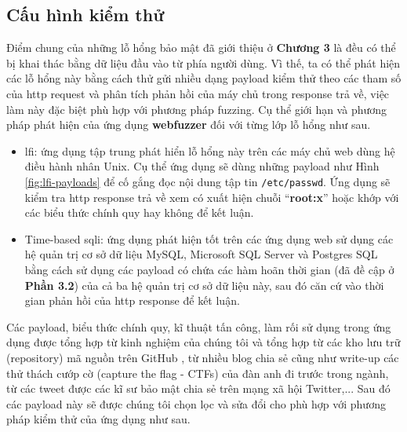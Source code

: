 \subsection{Cấu hình kiểm thử}
Điểm chung của những lỗ hổng bảo mật đã giới thiệu ở \textbf{Chương 3} là đều có thể bị khai thác bằng dữ liệu đầu vào từ phía người dùng. Vì thế, ta có thể phát hiện các lỗ hổng này bằng cách thử gửi nhiều dạng payload kiểm thử theo các tham số của \acrshort{http} request và phân tích phản hồi của máy chủ trong response trả về, việc làm này đặc biệt phù hợp với phương pháp fuzzing. Cụ thể giới hạn và phương pháp phát hiện của ứng dụng \textbf{webfuzzer} đối với từng lớp lỗ hổng như sau.
\begin{itemize}
    \item \acrshort{lfi}: ứng dụng tập trung phát hiển lỗ hổng này trên các máy chủ web dùng hệ điều hành nhân Unix. Cụ thể ứng dụng sẽ dùng những payload như Hình \ref{fig:lfi-payloads} để cố gắng đọc nội dung tập tin \texttt{/etc/passwd}. Ứng dụng sẽ kiểm tra \acrshort{http} response trả về xem có xuất hiện chuỗi ``\textbf{root:x}'' hoặc khớp với các biểu thức chính quy hay không để kết luận.
    \item Time-based \acrshort{sqli}: ứng dụng phát hiện tốt trên các ứng dụng web sử dụng các hệ quản trị cơ sở dữ liệu MySQL, Microsoft SQL Server và Postgres SQL bằng cách sử dụng các payload có chứa các hàm hoãn thời gian (đã đề cập ở \textbf{Phần 3.2}) của cả ba hệ quản trị cơ sở dữ liệu này, sau đó căn cứ vào thời gian phản hồi của \acrshort{http} response để kết luận.
\end{itemize}
Các payload, biểu thức chính quy, kĩ thuật tấn công, làm rối sử dụng trong ứng dụng được tổng hợp từ kinh nghiệm của chúng tôi và tổng hợp từ các kho lưu trữ (repository) mã nguồn trên GitHub \parencite{seclist-fuzzing,0verpwn-fuzzing}, từ nhiều blog chia sẻ cũng như write-up các thử thách cướp cờ (capture the flag - CTFs) của đàn anh đi trước trong ngành, từ các tweet được các kĩ sư bảo mật chia sẻ trên mạng xã hội Twitter,... Sau đó các payload này sẽ được chúng tôi chọn lọc và sửa đổi cho phù hợp với phương pháp kiểm thử của ứng dụng như sau.

